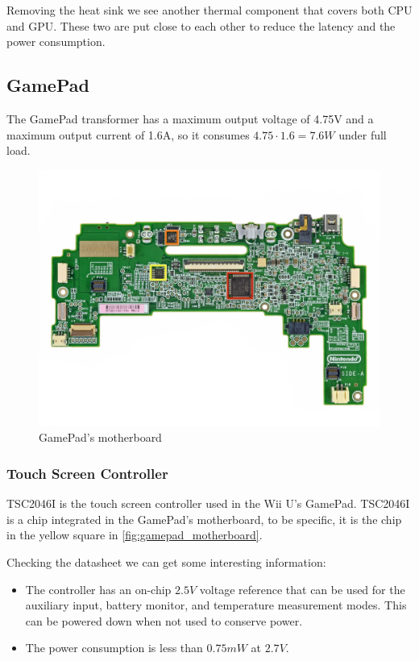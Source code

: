 \documentclass[11pt,a4paper,titlepage]{article}
\begin{document}
		Removing the heat sink we see another thermal component that covers both CPU and GPU. These two are put close to each other to reduce the latency and the power consumption.

	\subsection{GamePad}
		The GamePad transformer has a maximum output voltage of 4.75V and a maximum output current of 1.6A, so it consumes $4.75\cdot 1.6 = 7.6W$ under full load.
		\begin{figure}[htbp]
			\includegraphics[width=\textwidth]{gamepad_motherboard_front.png}
			\caption{GamePad's motherboard}
			\label{fig:gamepad_motherboard}
		\end{figure}
		\subsubsection{Touch Screen Controller}
			TSC2046I is the touch screen controller used in the Wii U's GamePad. TSC2046I is a chip integrated in the GamePad's motherboard, to be specific, it is the chip in the yellow square in \autoref{fig:gamepad_motherboard}.

			Checking the datasheet \cite{touchscreen} we can get some interesting information:
			\begin{itemize}
				\item The controller has an on-chip $2.5V$ voltage reference that can be used for the auxiliary input, battery monitor, and temperature measurement modes. This can be powered down when not used to conserve power.
				\item The power consumption is less than $0.75mW$ at $2.7V$.
			\end{itemize}
\end{document}
